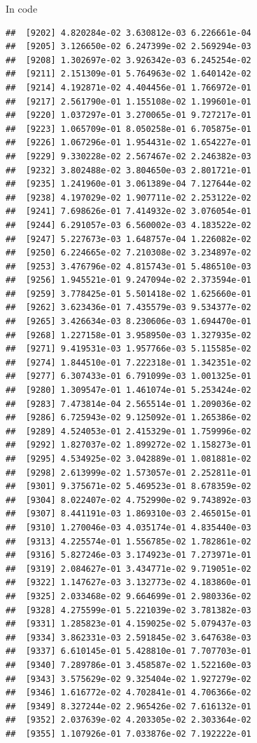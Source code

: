 \documentclass[ignorenonframetext,]{beamer}
\begin{document}
\begin{frame}[fragile]{In code}
\begin{verbatim}
##  [9202] 4.820284e-02 3.630812e-03 6.226661e-04
##  [9205] 3.126650e-02 6.247399e-02 2.569294e-03
##  [9208] 1.302697e-02 3.926342e-03 6.245254e-02
##  [9211] 2.151309e-01 5.764963e-02 1.640142e-02
##  [9214] 4.192871e-02 4.404456e-01 1.766972e-01
##  [9217] 2.561790e-01 1.155108e-02 1.199601e-01
##  [9220] 1.037297e-01 3.270065e-01 9.727217e-01
##  [9223] 1.065709e-01 8.050258e-01 6.705875e-01
##  [9226] 1.067296e-01 1.954431e-02 1.654227e-01
##  [9229] 9.330228e-02 2.567467e-02 2.246382e-03
##  [9232] 3.802488e-02 3.804650e-03 2.801721e-01
##  [9235] 1.241960e-01 3.061389e-04 7.127644e-02
##  [9238] 4.197029e-02 1.907711e-02 2.253122e-02
##  [9241] 7.698626e-01 7.414932e-02 3.076054e-01
##  [9244] 6.291057e-03 6.560002e-03 4.183522e-02
##  [9247] 5.227673e-03 1.648757e-04 1.226082e-02
##  [9250] 6.224665e-02 7.210308e-02 3.234897e-02
##  [9253] 3.476796e-02 4.815743e-01 5.486510e-03
##  [9256] 1.945521e-01 9.247094e-02 2.373594e-01
##  [9259] 3.778425e-01 5.501418e-02 1.625660e-01
##  [9262] 3.623436e-01 7.435579e-03 9.534377e-02
##  [9265] 3.426634e-03 8.230606e-03 1.694470e-01
##  [9268] 1.227158e-01 3.958950e-03 1.327935e-02
##  [9271] 9.419531e-03 1.957766e-03 5.115585e-02
##  [9274] 1.844510e-01 7.222318e-01 1.342351e-02
##  [9277] 6.307433e-01 6.791099e-03 1.001325e-01
##  [9280] 1.309547e-01 1.461074e-01 5.253424e-02
##  [9283] 7.473814e-04 2.565514e-01 1.209036e-02
##  [9286] 6.725943e-02 9.125092e-01 1.265386e-02
##  [9289] 4.524053e-01 2.415329e-01 1.759996e-02
##  [9292] 1.827037e-02 1.899272e-02 1.158273e-01
##  [9295] 4.534925e-02 3.042889e-01 1.081881e-02
##  [9298] 2.613999e-02 1.573057e-01 2.252811e-01
##  [9301] 9.375671e-02 5.469523e-01 8.678359e-02
##  [9304] 8.022407e-02 4.752990e-02 9.743892e-03
##  [9307] 8.441191e-03 1.869310e-03 2.465015e-01
##  [9310] 1.270046e-03 4.035174e-01 4.835440e-03
##  [9313] 4.225574e-01 1.556785e-02 1.782861e-02
##  [9316] 5.827246e-03 3.174923e-01 7.273971e-01
##  [9319] 2.084627e-01 3.434771e-02 9.719051e-02
##  [9322] 1.147627e-03 3.132773e-02 4.183860e-01
##  [9325] 2.033468e-02 9.664699e-01 2.980336e-02
##  [9328] 4.275599e-01 5.221039e-02 3.781382e-03
##  [9331] 1.285823e-01 4.159025e-02 5.079437e-03
##  [9334] 3.862331e-03 2.591845e-02 3.647638e-03
##  [9337] 6.610145e-01 5.428810e-01 7.707703e-01
##  [9340] 7.289786e-01 3.458587e-02 1.522160e-03
##  [9343] 3.575629e-02 9.325404e-02 1.927279e-02
##  [9346] 1.616772e-02 4.702841e-01 4.706366e-02
##  [9349] 8.327244e-02 2.965426e-02 7.616132e-01
##  [9352] 2.037639e-02 4.203305e-02 2.303364e-02
##  [9355] 1.107926e-01 7.033876e-02 7.192222e-01

\end{verbatim}
\end{frame}
\end{document}

